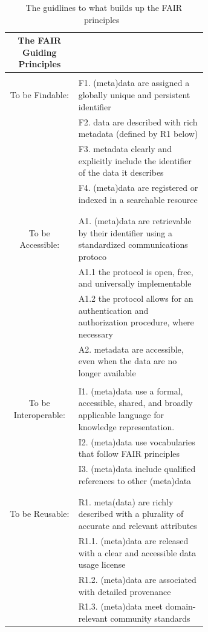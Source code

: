 \documentclass[]{final_report}
\begin{document}
\begin{table}[h!]
    \begin{center}
    \label{tab:FAIR}
        \begin{tabular}{c|p{0.65\linewidth}}
        The FAIR Guiding Principles\\
        \hline
        \\
        To be Findable: & F1. (meta)data are assigned a globally unique and persistent identifier\\
        & F2. data are described with rich metadata (defined by R1 below)\\ & F3. metadata clearly and explicitly include the identifier of the data it describes\\ & F4. (meta)data are registered or indexed in a searchable resource\\
        \\
        \hline
        \\
        To be Accessible: & A1. (meta)data are retrievable by their identifier using a standardized communications protoco\\
        & A1.1 the protocol is open, free, and universally implementable\\ & A1.2 the protocol allows for an authentication and authorization procedure, where necessary\\ & A2. metadata are accessible, even when the data are no longer available
        \\
        \hline
        \\
        To be Interoperable: & I1. (meta)data use a formal, accessible, shared, and broadly applicable language for knowledge representation.\\
        & I2. (meta)data use vocabularies that follow FAIR principles\\ & I3. (meta)data include qualified references to other (meta)data\\
        \\
        \hline
        \\
        To be Reusable: & R1. meta(data) are richly described with a plurality of accurate and relevant attributes\\
        & R1.1. (meta)data are released with a clear and accessible data usage license\\ & R1.2. (meta)data are associated with detailed provenance\\ &
        R1.3. (meta)data meet domain-relevant community standards\\
        \end{tabular}
        \caption{\label{Fair}The guidlines to what builds up the FAIR principles~\cite{wilkinson_fair_2016}}
    \end{center}
\end{table}
\end{document}

